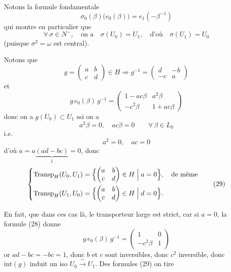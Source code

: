 \documentclass[11pt,a4paper]{article}
\begin{document}
Notons la formule fondamentale
\[
\boxed{\, \sigma_0(\beta)\bigl(e_0(\beta)\bigr) = e_1(-\beta^{-1}) \,} \tag{25}
\]
qui montre en particulier que
\[
\forall\, \sigma \in N^-, \quad \text{on a} \quad \sigma(U_0) = U_1, \quad \text{d'où} \quad \sigma(U_1) = U_0 \tag{26}
\]
(puisque $\sigma^2 = \omega$ est central).

Notons que
\[
g = \begin{pmatrix} a & b \\ c & d \end{pmatrix} \in H \Longrightarrow g^{-1} = \begin{pmatrix} d & -b \\ -c & a \end{pmatrix} \tag{27}
\]
et
\[
g\, e_0(\beta)\, g^{-1} = \begin{pmatrix} 1 - ac\beta & a^2\beta \\ -c^2\beta & 1 + ac\beta \end{pmatrix} \tag{28}
\]
donc on a $g(U_0) \subset U_1$ ssi on a
\[
a^2\beta = 0, \quad ac\beta = 0 \qquad \forall\, \beta \in L_0
\]
i.e.
\[
a^2 = 0, \quad ac = 0
\]
d'où $a = a\underbrace{(ad - bc)}_{1} = 0$, donc
\[
\left\{
\begin{aligned}
\mathrm{Transp}_H(U_0, U_1) &= \Bigl\{ \begin{pmatrix} a & b \\ c & d \end{pmatrix} \in H \Bigm| a = 0 \Bigr\}, \quad \text{de même} \\
\mathrm{Transp}_H(U_1, U_0) &= \Bigl\{ \begin{pmatrix} a & b \\ c & d \end{pmatrix} \in H \Bigm| d = 0 \Bigr\} .
\end{aligned}
\right. \tag{29}
\]

En fait,  que dans ces cas là, le transporteur large est strict, car si $a = 0$, la formule (28) donne
\[
g\, e_0(\beta)\, g^{-1} = \begin{pmatrix} 1 & 0 \\ -c^2\beta & 1 \end{pmatrix} \tag{28'}
\]
or $ad - bc = -bc = 1$, donc $b$ et $c$ sont inversibles, donc $c^2$ inversible, donc $\mathrm{int}(g)$ induit un iso $U_0 \xrightarrow{\ \sim\ } U_1$. Des formules (29) on tire
\end{document}
